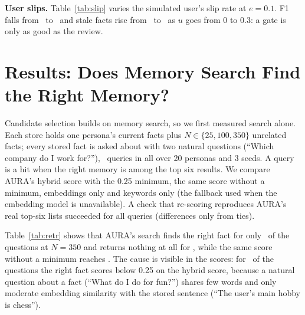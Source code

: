 \IfFileExists{IEEEtran.cls}{\documentclass[journal]{IEEEtran}\def\HAVEIEEE{1}}{\documentclass[10pt,twocolumn]{article}\usepackage[margin=0.7in,columnsep=0.25in]{geometry}}
\begin{document}
\textbf{User slips.} Table~\ref{tab:slip} varies the simulated user's slip rate at $e=0.1$. F1 falls from \slipFZero\ to \slipFThree\ and stale facts rise from \slipStaleZero\ to \slipStaleThree\ as $u$ goes from 0 to 0.3: a gate is only as good as the review.

\begin{table}[t]
\centering\small
\caption{Gate under user slips (simulated, $e=0.1$).}
\label{tab:slip}
\end{table}

\section{Results: Does Memory Search Find the Right Memory?}
\label{sec:retrieval}
Candidate selection builds on memory search, so we first measured search alone. Each store holds one persona's current facts plus $N\in\{25,100,350\}$ unrelated facts; every stored fact is asked about with two natural questions (``Which company do I work for?''), \retrQueries\ queries in all over 20 personas and 3 seeds. A query is a hit when the right memory is among the top six results. We compare AURA's hybrid score with the 0.25 minimum, the same score without a minimum, embeddings only and keywords only (the fallback used when the embedding model is unavailable). A check that re-scoring reproduces AURA's real top-six lists succeeded for all queries (differences only from ties).

\begin{table}[!t]
\centering\small
\caption{Retrieval: share of questions whose answer memory is in the top six.}
\label{tab:retr}
\end{table}

Table~\ref{tab:retr} shows that AURA's search finds the right fact for only \retrAuraHit\ of the questions at $N=350$ and returns nothing at all for \retrAuraEmpty, while the same score without a minimum reaches \retrNominHit. The cause is visible in the scores: for \retrBelowMin\ of the questions the right fact scores below 0.25 on the hybrid score, because a natural question about a fact (``What do I do for fun?'') shares few words and only moderate embedding similarity with the stored sentence (``The user's main hobby is chess'').

\begin{table}[t]
\centering\small
\caption{Retrieval by kind of fact at $N=350$ (hit@6; mean cosine similarity of the right fact).}
\label{tab:retrslot}
\end{table}
\end{document}
